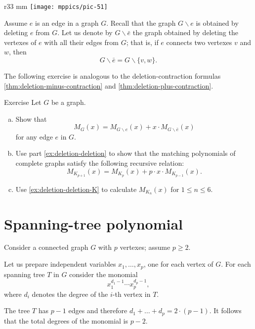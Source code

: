 {

\begin{wrapfigure}{r}{33 mm}
\vskip-8mm
\centering
\texttt{[image: mppics/pic-51]}
\vskip-0mm
\end{wrapfigure}

Assume $e$ is an edge in a graph $G$.
Recall that the graph $G\backslash e$ is obtained by deleting $e$ from $G$.
Let us denote by $G\backslash \bar e$ the graph obtained by deleting the vertexes of $e$ with all their edges from $G$;
that is, if $e$ connects two vertexes $v$ and $w$, then 
\[G\backslash \bar e=G\backslash \{v,w\}.\]

}

The following exercise is analogous to the deletion-contraction formulas \ref{thm:deletion-minus-contraction} and \ref{thm:deletion-plus-contraction}.

\begin{thm}{Exercise}\label{ex:deletion-deletion-total}
Let $G$ be a graph.
\begin{enumerate}[(a)]
\item\label{ex:deletion-deletion} Show that
\[M_G(x)=M_{G\backslash e}(x)+x\cdot M_{G\backslash \bar e}(x)\]
for any edge $e$ in $G$.

\item\label{ex:deletion-deletion-K} Use part \ref{ex:deletion-deletion} to show that the matching polynomials of complete graphs satisfy the following recursive relation:
\[M_{K_{p+1}}(x)=M_{K_{p}}(x)+p\cdot x\cdot M_{K_{p-1}}(x).\]

\item Use \ref{ex:deletion-deletion-K} to calculate $M_{K_n}(x)$ for $1\le n\le 6$.
\end{enumerate}

\end{thm}

\section*{Spanning-tree polynomial}

Consider a connected graph $G$ with $p$ vertexes;
assume $p\ge 2$.

Let us prepare independent variables $x_1,\dots,x_p$, one for each vertex of $G$.
For each spanning tree $T$ in $G$ consider the monomial 
\[x_1^{d_1-1}\cdots x_p^{d_p-1},\]
where $d_i$ denotes the degree of the $i$-th vertex in $T$.

The tree $T$ has $p-1$ edges and therefore 
$d_1+\dots+d_p=2\cdot(p-1)$.
It follows that the total degrees of the monomial is $p-2$.

